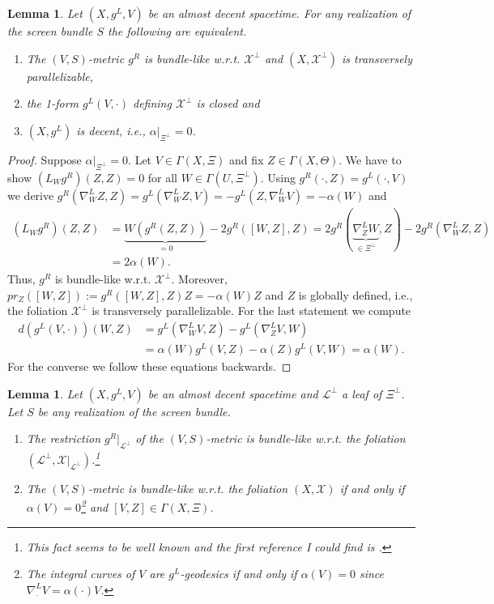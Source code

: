 \documentclass[a4paper,10pt,twoside]{amsart}
\newtheorem{lemma}[theorem]{Lemma}
\theoremstyle{definition}
\theoremstyle{remark}
\numberwithin{equation}{section}
\begin{document}
\begin{lemma}\label{parallel-bundle-like}
	Let $(X,g^{L},V)$ be an almost decent spacetime. For any realization of the screen bundle $S$ the following are equivalent.
	\begin{enumerate}
		\item
		The $(V,S)$-metric $g^{R}$ is bundle-like w.r.t. $\mathcal{X}^{\perp}$ and $(X,\mathcal{X}^{\perp})$ is transversely parallelizable,
		\item
		the 1-form $g^{L}(V,\cdot)$ defining $\mathcal{X}^{\perp}$ is closed and
		\item
		$(X,g^{L})$ is decent, i.e., $\alpha|_{\Xi^{\perp}}=0$.
	\end{enumerate}
\end{lemma}
\begin{proof}
	Suppose $\alpha|_{\Xi^{\perp}}=0$. Let $V \in \Gamma(X,\Xi)$ and fix $Z \in \Gamma(X,\Theta)$. We have to show $(L_{W}g^{R})(Z,Z)=0$
	for all $W \in \Gamma(U,\Xi^{\perp})$. Using $g^{R}(\cdot,Z) = g^{L}(\cdot,V)$ we derive
	$g^{R}(\nabla^{L}_{W}{Z},Z)=g^{L}(\nabla^{L}_{W}{Z},V)=-g^{L}(Z,\nabla^{L}_{W}{V})=-\alpha(W)$ and
	\begin{align*}
		(L_{W}g^{R})(Z,Z) &= \underbrace{W(g^{R}(Z,Z))}_{=0} - 2g^{R}([W,Z],Z)
				= 2g^{R}(\underbrace{\nabla^{L}_{Z}{W}}_{\in \Xi^{\perp}},Z)-2g^{R}(\nabla^{L}_{W}{Z},Z)\\
				&= 2\alpha(W).
	\end{align*}
	Thus, $g^{R}$ is bundle-like w.r.t. $\mathcal{X}^{\perp}$. Moreover, $pr_{Z}([W,Z]):= g^{R}([W,Z],Z)Z = -\alpha(W)Z$ and $Z$ is globally
	defined, i.e., the foliation $\mathcal{X}^{\perp}$ is transversely parallelizable.
	For the last statement we compute
	\begin{align*}
		d(g^{L}(V,\cdot))(W,Z) &= g^{L}(\nabla^{L}_{W}{V},Z) - g^{L}(\nabla^{L}_{Z}{V},W)\\
					&= \alpha(W)g^{L}(V,Z) -\alpha(Z)g^{L}(V,W) = \alpha(W).
	\end{align*}
	For the converse we follow these equations backwards.
\end{proof}
\begin{lemma}\label{bundle-like-restrictions}
	Let $(X,g^{L},V)$ be an almost decent spacetime and $\mathcal{L}^{\perp}$ a leaf of $\Xi^{\perp}$. Let $S$ be any realization of the screen
	bundle.
	\begin{enumerate}
		\item
		The restriction $g^{R}|_{\mathcal{L}^{\perp}}$ of the $(V,S)$-metric is bundle-like w.r.t. the foliation
		$(\mathcal{L}^{\perp},\mathcal{X}|_{\mathcal{L}^{\perp}})$.\footnote{This fact seems to be well known and the first reference I
											could find is \cite{MR1677118}.}
		\item
		The $(V,S)$-metric is bundle-like w.r.t. the foliation $(X,\mathcal{X})$ if and only if
		$\alpha(V)=0$\footnote{The integral curves of $V$ are $g^{L}$-geodesics if and only if $\alpha(V)=0$ since
						$\nabla^{L}_{\cdot}V = \alpha(\cdot)V$.}
		and $[V,Z] \in \Gamma(X,\Xi)$.
	\end{enumerate}
\end{lemma}
\end{document}
